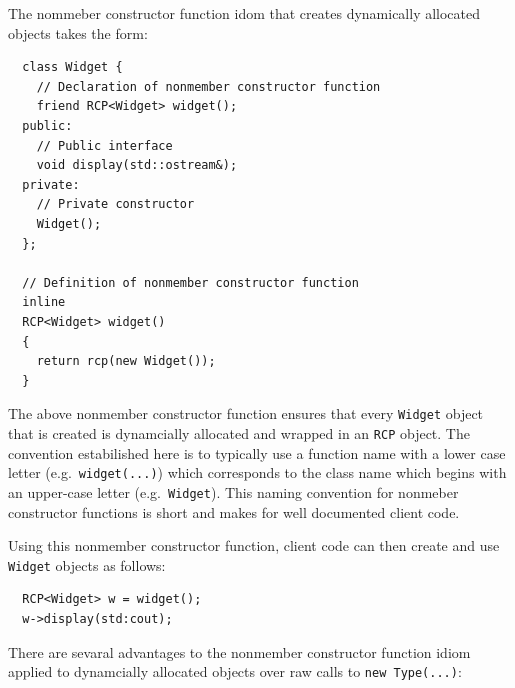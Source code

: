\documentclass[pdf,ps2pdf,11pt]{SANDreport}
\begin{document}
The nommeber constructor function idom that creates dynamically allocated
objects takes the form:

{\small\begin{verbatim}
  class Widget {
    // Declaration of nonmember constructor function
    friend RCP<Widget> widget();
  public:
    // Public interface
    void display(std::ostream&);
  private:
    // Private constructor
    Widget();
  };

  // Definition of nonmember constructor function
  inline
  RCP<Widget> widget()
  {
    return rcp(new Widget());
  }
\end{verbatim}}

The above nonmember constructor function ensures that every {}\texttt{Widget}
object that is created is dynamcially allocated and wrapped in an
{}\texttt{RCP} object.  The convention estabilished here is to typically use a
function name with a lower case letter (e.g.\ {}\texttt{widget(...)}) which
corresponds to the class name which begins with an upper-case letter (e.g.\
{}\texttt{Widget}).  This naming convention for nonmeber constructor functions
is short and makes for well documented client code.

Using this nonmember constructor function, client code can then create and use
{}\texttt{Widget} objects as follows:

{\small\begin{verbatim}
  RCP<Widget> w = widget();
  w->display(std:cout);
\end{verbatim}}

There are sevaral advantages to the nonmember constructor function idiom
applied to dynamcially allocated objects over raw calls to {}\texttt{new
Type(...)}:
\end{document}

